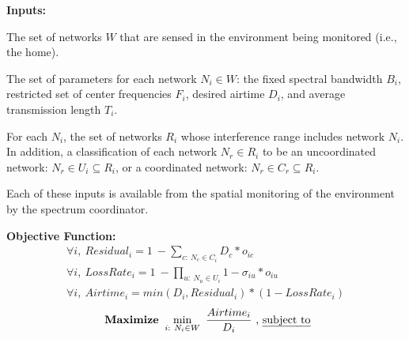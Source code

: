 %


\smallskip
\noindent \textbf{Inputs:}
\squishlist

	\item The set of networks $W$ that are sensed in the environment being monitored (i.e., the home).
	
	\item  The set of parameters for each network $N_i \in W$: the fixed spectral bandwidth $B_i$, restricted set of center frequencies $F_i$, desired airtime $D_i$, and average transmission length $T_i$.  
	
	\item For each $N_i$, the set of networks $R_i$ whose interference range includes network $N_i$.  In addition, a classification of each network $N_r \in R_i$ to be an uncoordinated network: $N_r \in U_i \subseteq R_i$, or a coordinated network: $N_r \in C_r \subseteq R_i$.

\squishend

	
Each of these inputs is available from the spatial monitoring of the environment by the spectrum coordinator.  

\smallskip
\noindent \textbf{Objective Function:} 
\begin{eqnarray}
%
\forall i, ~Residual_i = 1 ~- \sum_{c:~N_c \in C_i} D_c * o_{ic}\\
%
\forall i, ~LossRate_i = 1 ~- \prod_{u:~N_u \in U_i} 1 - \sigma_{iu} * o_{iu}\\
%
\forall i, ~Airtime_i = min(D_i, Residual_i) * (1-LossRate_i) 
\end{eqnarray}
\noindent $$\text{\textbf{~Maximize~}} \min_{i:~N_i \in W} ~\frac{Airtime_i}{D_i}~\text{, \emph{subject to}}$$

